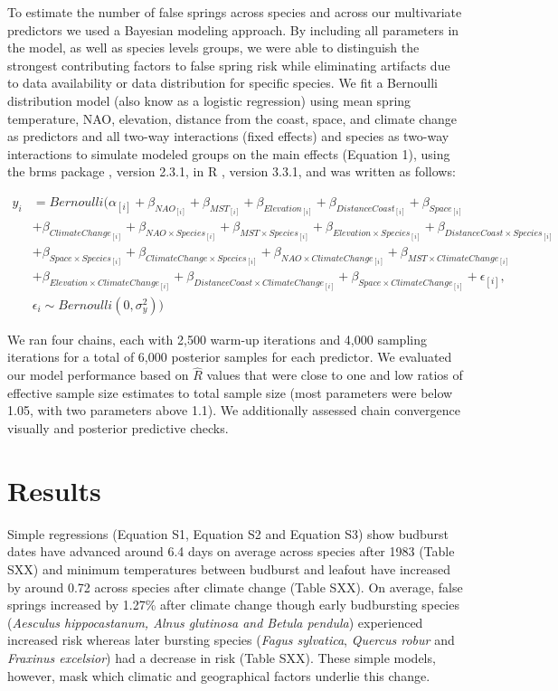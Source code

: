 \documentclass{article}\usepackage[]{graphicx}\usepackage[]{color}
\begin{document}
To estimate the number of false springs across species and across our multivariate predictors we used a Bayesian modeling approach. By including all parameters in the model, as well as species levels groups, we were able to distinguish the strongest contributing factors to false spring risk while eliminating artifacts due to data availability or data distribution for specific species. We fit a Bernoulli distribution model (also know as a logistic regression) using mean spring temperature, NAO, elevation, distance from the coast, space, and climate change as predictors and all two-way interactions (fixed effects) and species as two-way interactions to simulate modeled groups on the main effects (Equation 1), using the brms package \citep{brms}, version 2.3.1,  in R \citep{R}, version 3.3.1, and was written as follows:

\begin{align*}
y_i &= Bernoulli(\alpha_{[i]} +  \beta_{NAO_{[i]}} + \beta_{MST_{[i]}} + \beta_{Elevation_{[i]}} + \beta_{DistanceCoast_{[i]}} + \beta_{Space_{[i]}} \\ 
  &+ \beta_{ClimateChange_{[i]}} + \beta_{NAO \times Species_{[i]}} + \beta_{MST \times Species_{[i]}} + \beta_{Elevation \times Species_{[i]}} + \beta_{DistanceCoast \times Species_{[i]}}\\
  &+ \beta_{Space \times Species_{[i]}} + \beta_{ClimateChange \times Species_{[i]}} + \beta_{NAO \times ClimateChange_{[i]}} + \beta_{MST \times ClimateChange_{[i]}}\\
  &+ \beta_{Elevation \times ClimateChange_{[i]}} + \beta_{DistanceCoast \times ClimateChange_{[i]}} + \beta_{Space \times ClimateChange_{[i]}} + \epsilon_{[i]},\nonumber\\
  & \epsilon_i \sim Bernoulli(0,\sigma^2_y))\tag{1}
\end{align*}

We ran four chains, each with 2,500 warm-up iterations and 4,000 sampling iterations for a total of 6,000 posterior samples for each predictor. We evaluated our model performance based on $\hat{R}$ values that were close to one and low ratios of effective sample size estimates to total sample size (most parameters were below 1.05, with two parameters above 1.1). We additionally assessed chain convergence visually and posterior predictive checks.

\section*{Results}
Simple regressions (Equation S1, Equation S2 and Equation S3) show budburst dates have advanced around 6.4 days on average across species after 1983 (Table SXX) and minimum temperatures between budburst and leafout have increased by around 0.72  across species after climate change (Table SXX). On average, false springs increased by 1.27\% after climate change though early budbursting species (\textit{Aesculus hippocastanum, \textit{Alnus glutinosa} and \textit{Betula pendula}}) experienced increased risk whereas later bursting species (\textit{Fagus sylvatica}, \textit{Quercus robur} and \textit{Fraxinus excelsior}) had a decrease in risk (Table SXX). These simple models, however, mask which climatic and geographical factors underlie this change.
\end{document}
